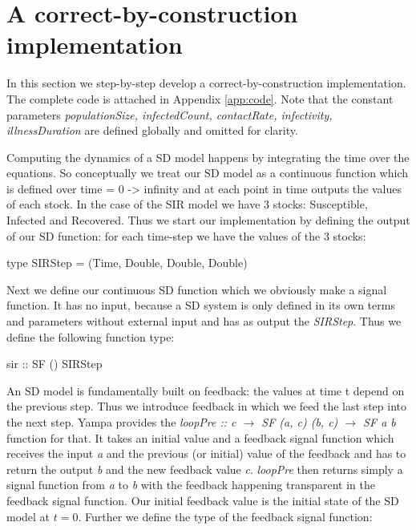 \section{A correct-by-construction implementation}
\label{sec:impl}
In this section we step-by-step develop a correct-by-construction implementation. The complete code is attached in Appendix \ref{app:code}. Note that the constant parameters \textit{populationSize, infectedCount, contactRate, infectivity, illnessDuration} are defined globally and omitted for clarity.

Computing the dynamics of a SD model happens by integrating the time over the equations. So conceptually we treat our SD model as a continuous function which is defined over time = 0 -> infinity and at each point in time outputs the values of each stock. In the case of the SIR model we have 3 stocks: Susceptible, Infected and Recovered. Thus we start our implementation by defining the output of our SD function: for each time-step we have the values of the 3 stocks:

\begin{HaskellCode}
type SIRStep = (Time, Double, Double, Double)
\end{HaskellCode}

Next we define our continuous SD function which we obviously make a signal function. It has no input, because a SD system is only defined in its own terms and parameters without external input and has as output the \textit{SIRStep}. Thus we define the following function type:

\begin{HaskellCode}
sir :: SF () SIRStep
\end{HaskellCode}

An SD model is fundamentally built on feedback: the values at time t depend on the previous step. Thus we introduce feedback in which we feed the last step into the next step. Yampa provides the \textit{loopPre :: c $\to$ SF (a, c) (b, c) $\to$ SF a b} function for that. It takes an initial value and a feedback signal function which receives the input \textit{a} and the previous (or initial) value of the feedback and has to return the output \textit{b} and the new feedback value \textit{c}. \textit{loopPre} then returns simply a signal function from \textit{a} to \textit{b} with the feedback happening transparent in the feedback signal function. Our initial feedback value is the initial state of the SD model at $t = 0$. Further we define the type of the feedback signal function:

